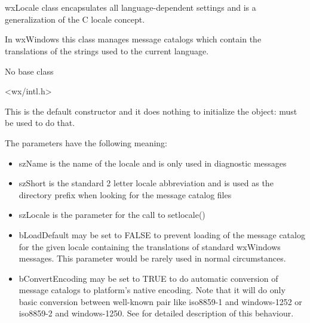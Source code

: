 \section{}\label{wxlocale}

wxLocale class encapsulates all language-dependent settings and is a
generalization of the C locale concept.

In wxWindows this class manages message catalogs which contain the translations
of the strings used to the current language.


No base class




<wx/intl.h>


\label{wxlocaledefctor}


This is the default constructor and it does nothing to initialize the object: 
 must be used to do that.


The parameters have the following meaning:
\begin{itemize}\itemsep=0pt
\item szName is the name of the locale and is only used in diagnostic messages
\item szShort is the standard 2 letter locale abbreviation and is used as the
directory prefix when looking for the message catalog files
\item szLocale is the parameter for the call to setlocale()
\item bLoadDefault may be set to FALSE to prevent loading of the message catalog
for the given locale containing the translations of standard wxWindows messages.
This parameter would be rarely used in normal circumstances.
\item bConvertEncoding may be set to TRUE to do automatic conversion of message
catalogs to platform's native encoding. Note that it will do only basic 
conversion between well-known pair like iso8859-1 and windows-1252 or
iso8859-2 and windows-1250. 
See  for detailed
description of this behaviour.
\end{itemize}

